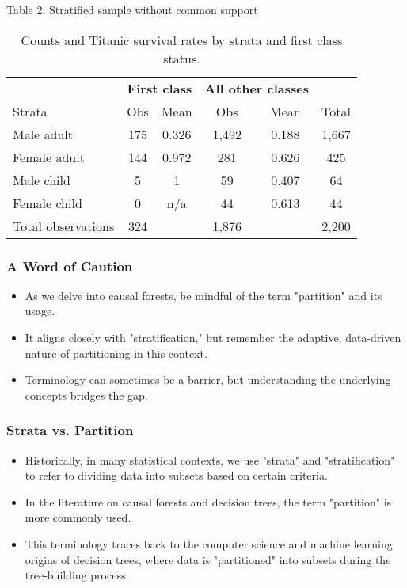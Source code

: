 \documentclass{beamer}
\begin{document}
\begin{frame}{Table 2: Stratified sample without common support}

{\renewcommand{\arraystretch}{1.1}
\tabcolsep 		
\begin{table}\small{}
\caption{Counts and Titanic survival rates by strata and first class status.}
\centering
\begin{tabular}{lcc|cc|c}
\toprule
\multicolumn{1}{c}{\textbf{}}&
\multicolumn{2}{c}{\textbf{First class}}&
\multicolumn{2}{c}{\textbf{All other classes}}&
\multicolumn{1}{c}{\textbf{}}\\
\multicolumn{1}{l}{Strata}&
\multicolumn{1}{c}{Obs}&
\multicolumn{1}{c}{Mean}&
\multicolumn{1}{c}{Obs}&
\multicolumn{1}{c}{Mean}&
\multicolumn{1}{c}{Total}\\
\midrule
Male adult		& 175	& 0.326	& 1,492	& 0.188	& 1,667 \\
Female adult	& 144	& 0.972	& 281	& 0.626	& 425 \\
Male child		& 5		& 1		& 59		& 0.407 	& 64\\
Female child	& 0		& n/a		& 44		& 0.613 	& 44\\
\midrule
Total	observations	& 324	&&	1,876	 && 2,200\\
\bottomrule
\end{tabular}
\label{tab:titanic-counts}
\end{table}}

\end{frame}


\begin{frame}
\frametitle{A Word of Caution}
\begin{itemize}
    \item As we delve into causal forests, be mindful of the term "partition" and its usage.
    \item It aligns closely with "stratification," but remember the adaptive, data-driven nature of partitioning in this context.
    \item Terminology can sometimes be a barrier, but understanding the underlying concepts bridges the gap.
\end{itemize}
\end{frame}


\begin{frame}
\frametitle{Strata vs. Partition}
\begin{itemize}
    \item Historically, in many statistical contexts, we use "strata" and "stratification" to refer to dividing data into subsets based on certain criteria.
    \item In the literature on causal forests and decision trees, the term "partition" is more commonly used.
    \item This terminology traces back to the computer science and machine learning origins of decision trees, where data is "partitioned" into subsets during the tree-building process.
\end{itemize}
\end{frame}
\end{document}
